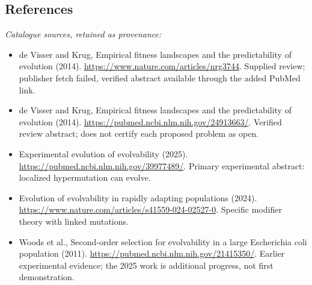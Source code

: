 \documentclass[11pt]{article}
\begin{document}
\subsection{References}
\noindent\emph{Catalogue sources, retained as provenance:}
\begin{itemize}
\item de Visser and Krug, Empirical fitness landscapes and the predictability of evolution (2014). \url{https://www.nature.com/articles/nrg3744}. Supplied review; publisher fetch failed, verified abstract available through the added PubMed link.
\item de Visser and Krug, Empirical fitness landscapes and the predictability of evolution (2014). \url{https://pubmed.ncbi.nlm.nih.gov/24913663/}. Verified review abstract; does not certify each proposed problem as open.
\item Experimental evolution of evolvability (2025). \url{https://pubmed.ncbi.nlm.nih.gov/39977489/}. Primary experimental abstract: localized hypermutation can evolve.
\item Evolution of evolvability in rapidly adapting populations (2024). \url{https://www.nature.com/articles/s41559-024-02527-0}. Specific modifier theory with linked mutations.
\item Woods et al., Second-order selection for evolvability in a large Escherichia coli population (2011). \url{https://pubmed.ncbi.nlm.nih.gov/21415350/}. Earlier experimental evidence; the 2025 work is additional progress, not first demonstration.
\end{itemize}
\end{document}
